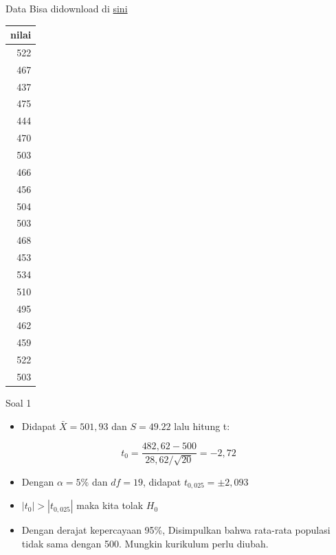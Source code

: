 \documentclass[
  ignorenonframetext,
]{beamer}
\providecommand{\tightlist}{%
  \setlength{\itemsep}{0pt}\setlength{\parskip}{0pt}}\usepackage{longtable,booktabs,array}
\begin{document}
\begin{frame}{Data}
\label{data}
Bisa didownload di
\href{https://docs.google.com/spreadsheets/d/1aE74llk9RkTuL2nLsp6WfvK0faz3DGKv/edit?usp=drive_link&ouid=117760147588370390523&rtpof=true&sd=true}{sini}

\begin{tabular}[t]{r}
\hline
nilai\\
\hline
522\\
\hline
467\\
\hline
437\\
\hline
475\\
\hline
444\\
\hline
470\\
\hline
503\\
\hline
466\\
\hline
456\\
\hline
504\\
\hline
503\\
\hline
468\\
\hline
453\\
\hline
534\\
\hline
510\\
\hline
495\\
\hline
462\\
\hline
459\\
\hline
522\\
\hline
503\\
\hline
\end{tabular}
\end{frame}

\begin{frame}{Soal 1}
\label{soal-1-1}
\begin{itemize}
\tightlist
\item
  Didapat \(\bar{X}=501,93\) dan \(S=49.22\) lalu hitung t:
\end{itemize}

\[
t_0=\frac{482,62-500}{28,62/\sqrt{20}}=-2,72
\]

\begin{itemize}
\item
  Dengan \(\alpha=5\%\) dan \(df=19\), didapat \(t_{0,025}=\pm2,093\)
\item
  \(|t_0| > |t_{0,025}|\) maka kita tolak \(H_0\)
\item
  Dengan derajat kepercayaan 95\%, Disimpulkan bahwa rata-rata populasi
  tidak sama dengan 500. Mungkin kurikulum perlu diubah.
\end{itemize}
\end{frame}
\end{document}
